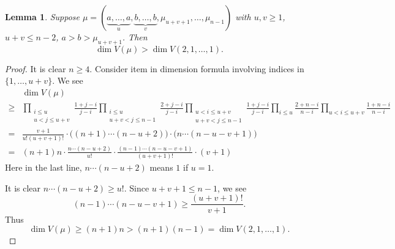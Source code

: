 \documentclass[a4paper]{amsart}
\theoremstyle{plain}
\newtheorem{lem}[thm]{Lemma}
\theoremstyle{remark} \newtheorem{remark}[thm]{Remark}
\theoremstyle{remark} \newtheorem{exercise}{Exercise}
\theoremstyle{remark} \newtheorem{example}{Example}
\numberwithin{equation}{section}
\begin{document}
\begin{lem}\label{uni-ineq1}
    Suppose $\mu=(\underbrace{a,\ldots,a}_u,\underbrace{b,\ldots,b}_v,\mu_{u+v+1},\ldots,\mu_{n-1})$ with $u,v\geqslant 1$, $u+v\leqslant n-2$, $a>b>\mu_{u+v+1}$. Then
    \[\dim V(\mu)>\dim V(2,1,\ldots,1).\]
\end{lem}
\begin{proof}
    It is clear $n\geqslant 4$. Consider item in dimension formula involving indices in $\{1,\ldots,u+v\}$. We see
    \begin{align*}
        &\dim V(\mu)\\
        \geqslant &\prod_{\substack{i\leqslant u\\ u<j\leqslant u+v}}\frac{1+j-i}{j-i}\prod_{\substack{i\leqslant u\\ u+v<j\leqslant n-1}}\frac{2+j-i}{j-i}\prod_{\substack{u<i\leqslant u+v\\ u+v<j\leqslant n-1}}\frac{1+j-i}{j-i}\prod_{i\leqslant u}\frac{2+n-i}{n-i}\prod_{u<i\leqslant u+v}\frac{1+n-i}{n-i}\\
        =&\frac{v+1}{u!(u+v+1)!}\cdot\big((n+1)\cdots(n-u+2)\big)\cdot\big(n\cdots(n-u-v+1)\big)\\
        =&(n+1)n\cdot\frac{n\cdots(n-u+2)}{u!}\cdot\frac{(n-1)\cdots(n-u-v+1)}{(u+v+1)!}\cdot(v+1)
    \end{align*}
    Here in the last line, $n\cdots(n-u+2)$ means $1$ if $u=1$.
    
    It is clear $n\cdots(n-u+2)\geqslant u!$. Since $u+v+1\leqslant n-1$, we see
    \[(n-1)\cdots(n-u-v+1)\geqslant \frac{(u+v+1)!}{v+1}.\]
    Thus
    \[\dim V(\mu)\geqslant (n+1)n>(n+1)(n-1)=\dim V(2,1,\ldots,1).\]
\end{proof}
\end{document}
